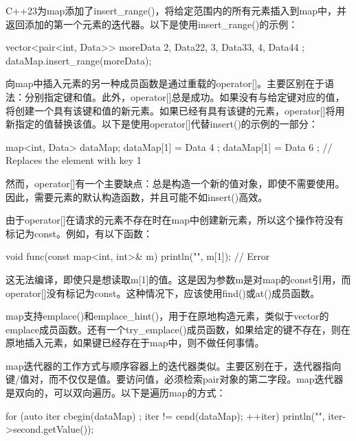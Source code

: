 

C++23为map添加了insert\_range()，将给定范围内的所有元素插入到map中，并返回添加的第一个元素的迭代器。以下是使用insert\_range()的示例：

\begin{cpp}
vector<pair<int, Data>> moreData { {2, Data{22}}, {3, Data{33}}, {4, Data{44}} };
dataMap.insert_range(moreData);
\end{cpp}


向map中插入元素的另一种成员函数是通过重载的operator[]。主要区别在于语法：分别指定键和值。此外，operator[]总是成功。如果没有与给定键对应的值，将创建一个具有该键和值的新元素。如果已经有具有该键的元素，operator[]将用新指定的值替换该值。以下是使用operator[]代替insert()的示例的一部分：

\begin{cpp}
map<int, Data> dataMap;
dataMap[1] = Data { 4 };
dataMap[1] = Data { 6 }; // Replaces the element with key 1
\end{cpp}

然而，operator[]有一个主要缺点：总是构造一个新的值对象，即使不需要使用。因此，需要元素的默认构造函数，并且可能不如insert()高效。

由于operator[]在请求的元素不存在时在map中创建新元素，所以这个操作符没有标记为const。例如，有以下函数：

\begin{cpp}
void func(const map<int, int>& m)
{
    println("{}", m[1]); // Error
}
\end{cpp}

这无法编译，即使只是想读取m[1]的值。这是因为参数m是对map的const引用，而operator[]没有标记为const。这种情况下，应该使用find()或at()成员函数。


map支持emplace()和emplace\_hint()，用于在原地构造元素，类似于vector的emplace成员函数。还有一个try\_emplace()成员函数，如果给定的键不存在，则在原地插入元素，如果键已经存在于map中，则不做任何事情。


map迭代器的工作方式与顺序容器上的迭代器类似。主要区别在于，迭代器指向键/值对，而不仅仅是值。要访问值，必须检索pair对象的第二字段。map迭代器是双向的，可以双向遍历。以下是遍历map的方式：

\begin{cpp}
for (auto iter { cbegin(dataMap) }; iter != cend(dataMap); ++iter) {
    println("{}", iter->second.getValue());
}
\end{cpp}

